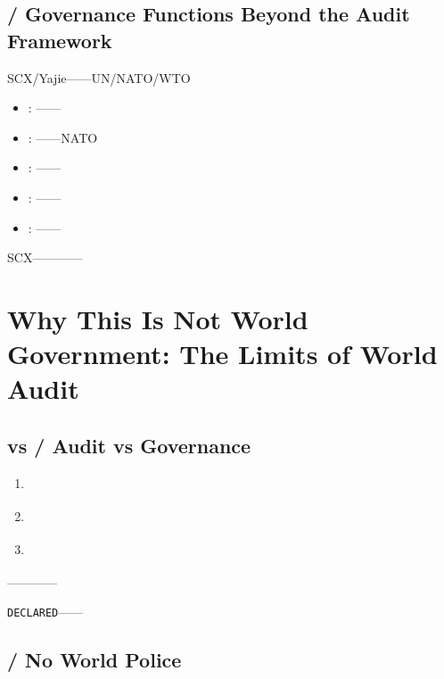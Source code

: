 \documentclass[12pt,a4paper]{article}
\theoremstyle{remark}
\newcommand{\DECLARED}{\texttt{DECLARED}}
\begin{document}
\subsection{ / Governance Functions Beyond the Audit Framework}\label{sec:beyond_audit}

SCX/Yajie——UN/NATO/WTO

\begin{itemize}[nosep]
    \item \textbf{}: ——
    \item \textbf{}: ——NATO
    \item \textbf{}: ——
    \item \textbf{}: ——
    \item \textbf{}: ——
\end{itemize}

SCX\textbf{}————


\section{}
\section{Why This Is Not World Government: The Limits of World Audit}

\subsection{ vs  / Audit vs Governance}



\begin{keybox}[title=\textbf{ / Core Distinction}]
    \textbf{}
    \begin{enumerate}[label=(\arabic*)]
        \item \textbf{}
        \item \textbf{}
        \item \textbf{}
    \end{enumerate}

    \textbf{}\textbf{}——\textbf{}——
\end{keybox}

\textbf{}\DECLARED{}——

\subsection{ / No World Police}
\end{document}
